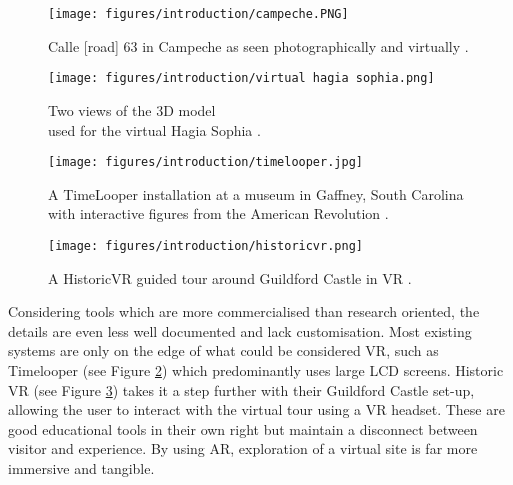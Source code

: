 \documentclass[12pt, a4paper]{article}
\begin{document}
\begin{figure}[]
\begin{minipage}{.48\textwidth}
  \centering
  \texttt{[image: figures/introduction/campeche.PNG]}
  \caption{Calle [road] 63 in Campeche as seen photographically and virtually \cite{existing:campeche}.}
  \label{fig:campeche}
\end{minipage}
\begin{minipage}{.04\textwidth}
  \hspace{0.1cm}
\end{minipage}
\begin{minipage}{.48\textwidth}
  \centering
  \texttt{[image: figures/introduction/virtual hagia sophia.png]}
  \caption{Two views of the 3D model \\ used for the virtual Hagia Sophia \cite{existing:hagia}.}
  \label{fig:hagiasophia}
\end{minipage}
\end{figure}

\begin{figure}
    \centering
    \texttt{[image: figures/introduction/timelooper.jpg]}
    \caption{A TimeLooper installation at a museum in Gaffney, South Carolina with interactive figures from the American Revolution \cite{existing:timelooper}.}
    \label{fig:timelooper}
\end{figure}

\begin{figure}
    \centering
    \texttt{[image: figures/introduction/historicvr.png]}
    \caption{A HistoricVR guided tour around Guildford Castle in VR \cite{existing:historicvr}.}
    \label{fig:historicvr}
\end{figure}

Considering tools which are more commercialised than research oriented, the details are even less well documented and lack customisation. Most existing systems are only on the edge of what could be considered VR, such as Timelooper \cite{existing:timelooper} (see Figure \ref{fig:timelooper}) which predominantly uses large LCD screens. Historic VR \cite{existing:historicvr} (see Figure \ref{fig:historicvr}) takes it a step further with their Guildford Castle set-up, allowing the user to interact with the virtual tour using a VR headset. These are good educational tools in their own right but maintain a disconnect between visitor and experience. By using AR, exploration of a virtual site is far more immersive and tangible. 
\end{document}
